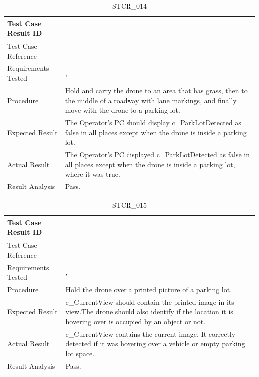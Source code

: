 \documentclass[12pt, titlepage]{article}
\begin{document}
\begin{table}[!h]
\begin{center}
\caption {STCR\_014}
\label{tab:STCR_014}
\begin{tabular}{ | m{3.2cm} | m{12.2cm} | } 
\hline
Test Case Result ID & \nameref{tab:STCR_014} \\ 
\hline
Test Case Reference & \nameref{tab:STC_014}  \\ 
\hline
Requirements Tested & \nameref{GEN_001}, \nameref{SR_009}
\\ 
\hline
Procedure & Hold and carry the drone to an area that has grass, then to the middle of a roadway with lane markings, and finally move with the drone to a parking lot. \\
\hline
Expected Result & The Operator’s PC should display c_ParkLotDetected as false in all places except when the drone is inside a parking lot.   \\ 
\hline
Actual Result &  The Operator’s PC displayed c_ParkLotDetected as false in all
places except when the drone is inside a parking lot, where it was true.  \\
\hline
Result Analysis & Pass.  \\ 
\hline
\end{tabular}
\end{center}
\end{table}




\begin{table}[!h]
\begin{center}
\caption {STCR\_015}
\label{tab:STCR_015}
\begin{tabular}{ | m{3.2cm} | m{12.2cm} | } 
\hline
Test Case Result ID & \nameref{tab:STCR_015} \\ 
\hline
Test Case Reference & \nameref{tab:STC_015}  \\ 
\hline
Requirements Tested & \nameref{GEN_005}, \nameref{SR_009} \\ 
\hline
Procedure & Hold the drone over a printed picture of a parking lot. \\
\hline
Expected Result & c\_CurrentView should contain the printed image in its view.The drone should also identify if the location it is hovering over is occupied by an object or not.   \\ 
\hline
Actual Result &   c\_CurrentView contains the current image. It correctly detected if it was hovering over a vehicle or empty parking lot space.  \\
\hline
Result Analysis & Pass.  \\ 
\hline
\end{tabular}
\end{center}
\end{table}
\end{document}
